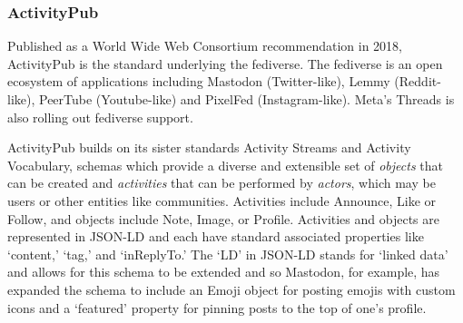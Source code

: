 


\subsubsection{ActivityPub}

Published as a World Wide Web Consortium recommendation in 2018, ActivityPub is the standard underlying the fediverse. The fediverse is an open ecosystem of applications including Mastodon (Twitter-like), Lemmy (Reddit-like), PeerTube (Youtube-like) and PixelFed (Instagram-like).
Meta's Threads is also rolling out fediverse support.

ActivityPub builds on its sister standards Activity Streams and Activity Vocabulary, schemas which provide a diverse and extensible set of \emph{objects} that can be created and \emph{activities} that can be performed by \emph{actors}, which may be users or other entities like communities.
Activities include Announce, Like or Follow, and objects include Note, Image, or Profile.
Activities and objects are represented in JSON-LD and each have standard associated properties like `content,' `tag,' and `inReplyTo.'
The `LD' in JSON-LD stands for `linked data' and allows for this schema to be extended and so
Mastodon, for example, has expanded the schema to include an Emoji object for posting emojis with custom icons and a `featured' property for pinning posts to the top of one's profile.

